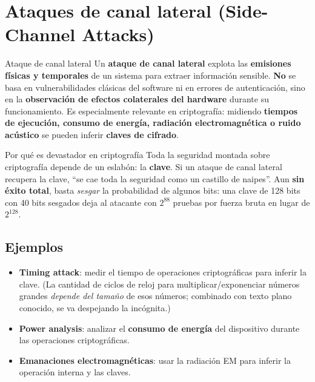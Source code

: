 \documentclass[11pt,a4paper]{article}
\begin{document}
\section{Ataques de canal lateral (Side-Channel Attacks)}

\begin{defbox}{Ataque de canal lateral}
Un \textbf{ataque de canal lateral} explota las \textbf{emisiones físicas y temporales} de un
sistema para extraer información sensible. \textbf{No} se basa en vulnerabilidades clásicas del
software ni en errores de autenticación, sino en la \textbf{observación de efectos colaterales
del hardware} durante su funcionamiento. Es especialmente relevante en criptografía: midiendo
\textbf{tiempos de ejecución, consumo de energía, radiación electromagnética o ruido acústico}
se pueden inferir \textbf{claves de cifrado}.
\end{defbox}

\begin{warnbox}{Por qué es devastador en criptografía}
Toda la seguridad montada sobre criptografía depende de un eslabón: la \textbf{clave}. Si un
ataque de canal lateral recupera la clave, ``se cae toda la seguridad como un castillo de
naipes''. Aun \textbf{sin éxito total}, basta \emph{sesgar} la probabilidad de algunos bits:
una clave de 128 bits con 40 bits sesgados deja al atacante con $2^{88}$ pruebas por fuerza
bruta en lugar de $2^{128}$.
\end{warnbox}

\subsection{Ejemplos}
\begin{slidebox}
\begin{itemize}[leftmargin=1.4em,itemsep=2pt]
  \item \textbf{Timing attack}: medir el tiempo de operaciones criptográficas para inferir la
        clave. (La cantidad de ciclos de reloj para multiplicar/exponenciar números grandes
        \emph{depende del tamaño} de esos números; combinado con texto plano conocido, se va
        despejando la incógnita.)
  \item \textbf{Power analysis}: analizar el \textbf{consumo de energía} del dispositivo durante
        las operaciones criptográficas.
  \item \textbf{Emanaciones electromagnéticas}: usar la radiación EM para inferir la operación
        interna y las claves.
\end{itemize}
\end{slidebox}
\end{document}
